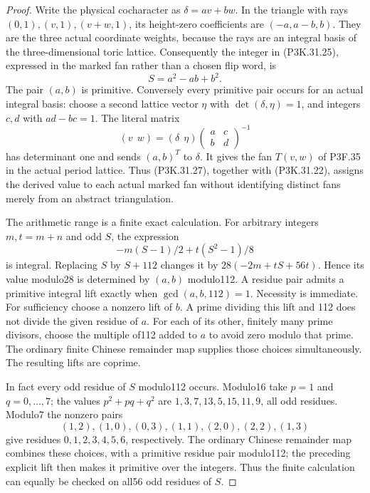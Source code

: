 \begin{proof}
Write the physical cocharacter as
\(\delta=a v+b w\). In the triangle with rays
\((0,1),(v,1),(v+w,1)\), its height-zero coefficients
are \((-a,a-b,b)\). They are the three actual
coordinate weights, because the rays are an integral
basis of the three-dimensional toric lattice.
Consequently the integer in (P3K.31.25), expressed in the
marked fan rather than a chosen flip word, is
\[
                         S=a^2-ab+b^2.
                                                        \tag{P3K.31.27}
\]
The pair \((a,b)\) is primitive. Conversely every
primitive pair occurs for an actual integral basis:
choose a second lattice vector \(\eta\) with
\(\det(\delta,\eta)=1\), and integers \(c,d\) with
\(ad-bc=1\). The literal matrix
\[
       (v\ \ w)=(\delta\ \ \eta)
                        \begin{pmatrix}a&c\\b&d\end{pmatrix}^{-1}
\]
has determinant one and sends \((a,b)^T\) to \(\delta\).
It gives the fan \(T(v,w)\) of P3F.35 in the actual
period lattice.
Thus (P3K.31.27), together with (P3K.31.22), assigns the
derived value to each actual marked fan
without identifying distinct fans merely from an
abstract triangulation.

The arithmetic range is a finite exact calculation.
For arbitrary integers \(m,t=m+n\) and odd \(S\),
the expression
\[
                  -m(S-1)/2+t(S^2-1)/8
\]
is integral. Replacing \(S\) by \(S+112\) changes it
by \(28(-2m+tS+56t)\). Hence its value modulo28 is
determined by \((a,b)\) modulo112.
A residue pair admits a primitive integral lift
exactly when \(\gcd(a,b,112)=1\). Necessity is
immediate. For sufficiency choose a nonzero lift
of \(b\). A prime dividing this lift and 112 does
not divide the given residue of \(a\). For each
of its other, finitely many prime divisors, choose
the multiple of112 added to \(a\) to avoid zero
modulo that prime. The ordinary finite Chinese
remainder map supplies those choices simultaneously.
The resulting lifts are coprime.

In fact every odd residue of \(S\) modulo112 occurs.
Modulo16 take \(p=1\) and \(q=0,\ldots,7\); the
values \(p^2+pq+q^2\) are
\(1,3,7,13,5,15,11,9\), all odd residues.
Modulo7 the nonzero pairs
\[
 (1,2),(1,0),(0,3),(1,1),(2,0),(2,2),(1,3)
\]
give residues \(0,1,2,3,4,5,6\), respectively.
The ordinary Chinese remainder map combines these
choices, with a primitive residue pair modulo112;
the preceding explicit lift then makes it primitive
over the integers. Thus the finite calculation can
equally be checked on all56 odd residues of \(S\).


\end{proof}
